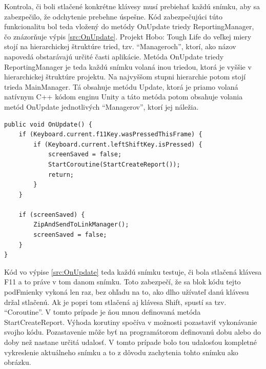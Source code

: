 \documentclass[slovak, bachelorpractice]{diploma}
\begin{document}
Kontrola, či boli stlačené konkrétne klávesy musí prebiehať každú snímku, aby sa zabezpečilo, že odchytenie prebehne úspešne. Kód zabezpečujúci túto funkcionalitu bol teda vložený do metódy OnUpdate triedy ReportingManager, čo znázorňuje výpis \ref{src:OnUpdate}. Projekt Hobo: Tough Life do veľkej miery stojí na hierarchickej štruktúre tried, tzv. \enquote{Manageroch}, ktorí, ako názov napovedá obstarávajú určité časti aplikácie. Metóda OnUpdate triedy ReportingManager je teda každú snímku volaná inou triedou, ktorá je vyššie v hierarchickej štruktúre projektu. Na najvyššom stupni hierarchie potom stojí trieda MainManager. Tá obsahuje metódu Update, ktorá je priamo volaná natívnym C++ kódom enginu Unity a táto metóda potom obsahuje volania metód OnUpdate jednotlivých \enquote{Managerov}, ktorí jej náležia.
\vspace{10pt}
\begin{lstlisting}[label=src:OnUpdate,caption={Metóda OnUpdate triedy ReportingManager}]
public void OnUpdate() {
    if (Keyboard.current.f11Key.wasPressedThisFrame) {
        if (Keyboard.current.leftShiftKey.isPressed) {
            screenSaved = false;
            StartCoroutine(StartCreateReport());
            return;
        }
    }

    if (screenSaved) {
        ZipAndSendToLinkManager();
        screenSaved = false;
    }
}
\end{lstlisting}

Kód vo výpise \ref{src:OnUpdate} teda každú snímku testuje, či bola stlačená klávesa F11 a to práve v tom danom snímku. Toto zabezpečí, že sa blok kódu tejto podFmienky vykoná len raz, bez ohľadu na to, ako dlho užívateľ danú klávesu držal stlačenú. Ak je popri tom stlačená aj klávesa Shift, spustí sa tzv. \enquote{Coroutine}. V tomto prípade je ňou mnou definovaná metóda StartCreateReport. Výhoda korutiny spočíva v možnosti pozastaviť vykonávanie svojho kódu. Pozastavenie môže byť na programátorom definovanú dobu alebo do doby než nastane určitá udalosť. V tomto prípade bolo tou udalosťou kompletné vykreslenie aktuálneho snímku a to z dôvodu zachytenia tohto snímku ako obrázku.
\end{document}
